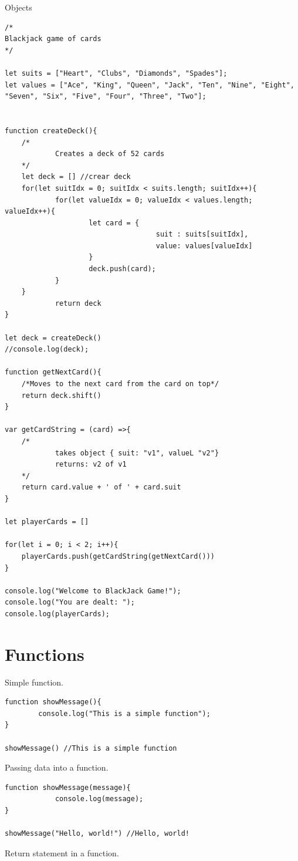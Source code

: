 \documentclass[10pt, a4paper, twocolumn]{article}
\begin{document}
Objects

\begin{lstlisting}
/*
Blackjack game of cards
*/

let suits = ["Heart", "Clubs", "Diamonds", "Spades"];
let values = ["Ace", "King", "Queen", "Jack", "Ten", "Nine", "Eight", "Seven", "Six", "Five", "Four", "Three", "Two"];


function createDeck(){
	/*
			Creates a deck of 52 cards
	*/
	let deck = [] //crear deck
	for(let suitIdx = 0; suitIdx < suits.length; suitIdx++){
			for(let valueIdx = 0; valueIdx < values.length; valueIdx++){
					let card = {
									suit : suits[suitIdx],
									value: values[valueIdx]
					}
					deck.push(card);
			}
	}
			return deck
}

let deck = createDeck()
//console.log(deck);

function getNextCard(){
	/*Moves to the next card from the card on top*/
	return deck.shift()
}

var getCardString = (card) =>{
	/*
			takes object { suit: "v1", valueL "v2"}
			returns: v2 of v1
	*/
	return card.value + ' of ' + card.suit
}

let playerCards = []

for(let i = 0; i < 2; i++){
	playerCards.push(getCardString(getNextCard()))
}

console.log("Welcome to BlackJack Game!");
console.log("You are dealt: ");
console.log(playerCards);
\end{lstlisting}

\section{Functions}

Simple function.

\begin{lstlisting}
function showMessage(){
		console.log("This is a simple function");
}

showMessage() //This is a simple function
\end{lstlisting}

Passing data into a function.

\begin{lstlisting}
function showMessage(message){
			console.log(message);
}

showMessage("Hello, world!") //Hello, world!

\end{lstlisting}

Return statement in a function.
\end{document}
